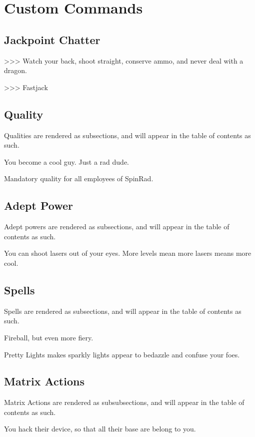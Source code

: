 \documentclass[red, openany, logo-1e]{shadowrun}
\begin{document}
\chapter{Custom Commands}

\section{Jackpoint Chatter}
\begin{chatter}
    >>> Watch your back, shoot straight, conserve ammo, and never deal with a dragon.

    >>> Fastjack
\end{chatter}

\section{Quality}
Qualities are rendered as subsections, and will appear in the table of contents as such.

{
    You become a cool guy. Just a rad dude.

    Mandatory quality for all employees of SpinRad.
}

\section{Adept Power}
Adept powers are rendered as subsections, and will appear in the table of contents as such.

{
    You can shoot lasers out of your eyes. More levels mean more lasers means more cool.
}

\section{Spells}
Spells are rendered as subsections, and will appear in the table of contents as such.

{
    Fireball, but even more fiery.
}

{
    Pretty Lights makes sparkly lights appear to bedazzle and confuse your foes.
}

\section{Matrix Actions}
Matrix Actions are rendered as subsubsections, and will appear in the table of contents as such.

{
    You hack their device, so that all their base are belong to you.
}
\end{document}
